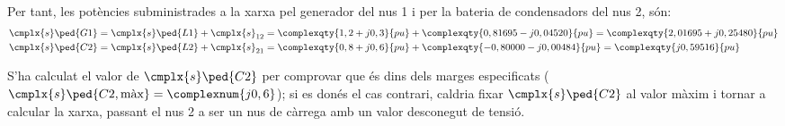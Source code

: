\begin{exemple}
    Per tant, les potències subministrades a la xarxa pel generador del
    nus 1 i per la bateria de condensadors del nus 2, són:
    \begin{align*}
     \cmplx{s}\ped{G1} &= \cmplx{s}\ped{L1} + \cmplx{s}_{12} = \complexqty{1,2+j0,3}{pu} + \complexqty{0,81695 - j 0,04520}{pu} =
     \complexqty{2,01695 + j 0,25480}{pu} \\
     \cmplx{s}\ped{C2} &= \cmplx{s}\ped{L2} + \cmplx{s}_{21} = \complexqty{0,8+j0,6}{pu} + \complexqty{-0,80000 - j 0,00484}{pu} =
     \complexqty{  j 0,59516}{pu}
    \end{align*}

    S'ha calculat el valor de $\cmplx{s}\ped{C2}$ per  comprovar
    que és dins dels marges especificats
    ($\cmplx{s}\ped{C2,\text{màx}}=\complexnum{j0,6}$); si es donés el cas contrari,
    caldria fixar $\cmplx{s}\ped{C2}$ al  valor màxim i tornar a
    calcular la xarxa, passant el nus 2 a ser un nus de càrrega amb
    un valor  desconegut de tensió.
\end{exemple}

